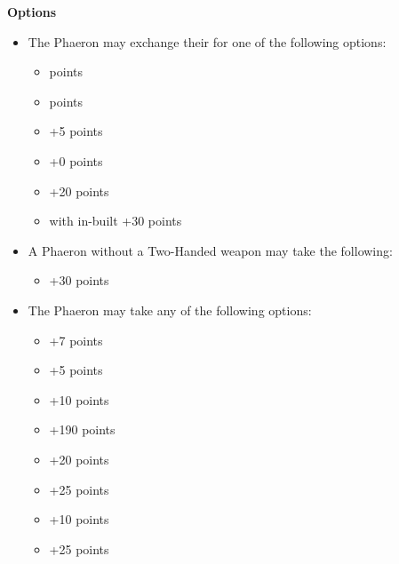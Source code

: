 \newpage
\vspace*{1em}
\hspace{0.5em}
\begin{minipage}[t][\textheight][t]{0.72\textwidth}
	\textbf{Options}
	\begin{itemize}
		\item The Phaeron may exchange their  for one of the following options:
		\begin{itemize}			
			\item {}  points
			\item {}  points
			\item {} \dotfill +5 points
			\item {} \dotfill +0 points
			\item {} \dotfill +20 points
			\item {} with in-built  \dotfill +30 points
		\end{itemize}
		\item A Phaeron without a Two-Handed weapon may take the following:
		\begin{itemize}
			\item {} \dotfill +30 points
		\end{itemize}
		\item The Phaeron may take any of the following options:
		\begin{itemize}
			\item {} \dotfill +7 points
			\item {} \dotfill +5 points
			\item {} \dotfill +10 points
			\item {} \dotfill +190 points
			\item {} \dotfill +20 points
			\item {} \dotfill +25 points
			\item {} \dotfill +10 points
			\item {} \dotfill +25 points

\end{itemize}
\end{itemize}
\end{minipage}
